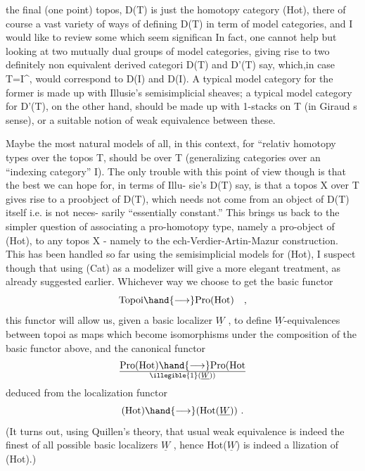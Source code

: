 the final (one point) topos,  D(T) is just the homotopy category
(Hot), there   of course a vast variety of ways of defining D(T) in term
of model categories, and I would like to review some which seem significan
In fact, one cannot help but looking at two mutually dual groups of model
categories, giving rise to  two definitely non equivalent derived categori
D(T) and D'(T) say, which,in case T=I\^{}, would correspond to D(I) and
D(I). A typical model category for the former  is made up with
Illusie's semisimplicial sheaves; a typical model category for 
D'(T), on the other hand, should be made up with 1-stacks on T (in Giraud
s sense), or a suitable notion of weak equivalence between these.

Maybe the most natural models of all, in this context, for ``relativ
homotopy types over the topos T, should be \hand{\uline{\textcolor{black}{topoI}}}  over T (generalizing 
categories over an ``indexing category'' I). The only trouble with this
point of view though is that the best we can hope for, in terms of Illu-%
sie's D(T) say, is that a topos X over T gives rise to a proobject of
D(T), which needs not come from an object of D(T) itself i.e. is not neces-%
sarily  ``essentially constant.'' This brings us back to the simpler
 question of associating a pro-homotopy type, namely a pro-object of (Hot),
to any topos X - namely  to the \hand{\v{\textcolor{black}{C}}}ech-Verdier-Artin-Mazur construction.
This has been handled so far using the semisimplicial models for (Hot),
I suspect though that using (Cat) as a modelizer will give a more elegant
treatment, as already suggested earlier. Whichever way we choose to get
the basic functor
\[ \text{Topoi} \hand{\longrightarrow} \text{Pro(Hot)} \quad , \]
this functor will allow us, given a basic localizer $\underline{W}$ , to define
$\underline{W}$-equivalences between topoi\hand{\unsure{,}} as maps  which become isomorphisms
under the composition of the basic functor above, and the canonical
functor
\[ \text{Pro(Hot)} \hand{\longrightarrow} \text{Pro(Hot}\over{\illegible{1}}{(}\underline{W})) \]
deduced from the localization functor 
\[ \text{(Hot)} \hand{\longrightarrow} \text{(Hot(}\underline{W})) \ . \]
(It turns out, using Quillen's theory, that usual weak equivalence is
indeed the finest of all possible basic localizers $\underline{W}$ , hence Hot($\underline{W}$) is
indeed a llization of (Hot).)

